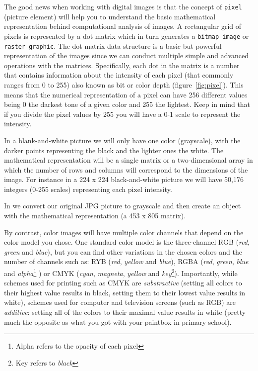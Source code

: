 The good news when working with digital images is that the concept of \texttt{pixel} (picture element) will help you to understand the basic mathematical representation behind computational analysis of images. A rectangular grid of pixels is represented by a dot matrix which in turn generates a \texttt{bitmap image} or \texttt{raster graphic}. The dot matrix data structure is a basic but powerful representation of the images since we can conduct multiple simple and advanced operations with the matrices. Specifically, each dot in the matrix is a number that contains information about the intensity of each pixel (that commonly ranges from 0 to 255) also known as bit or color depth (figure~\ref{fig:pixel}). This means that the numerical representation of a pixel can have 256 different values being 0 the darkest tone of a given color and 255 the lightest. Keep in mind that if you divide the pixel values by 255 you will have a 0-1 scale to represent the intensity.

In a blank-and-white picture we will only have one color (grayscale), with the darker points representing the black and the lighter ones the white. The mathematical representation will be a single matrix or a two-dimensional array in which the number of rows and columns will correspond to the dimensions of the image. For instance in a 224 x 224 black-and-white picture we will have 50,176 integers (0-255 scales) representing each pixel intensity. 

In  we convert our original JPG picture to grayscale and then create an object with the mathematical representation (a 453 x 805 matrix).


By contrast, color images will have multiple color channels that depend on the color model you chose. One standard color model is the  three-channel RGB (\textit{red}, \textit{green} and \textit{blue}), but you can find other variations in the chosen colors and the number of channels such as: RYB (\textit{red}, \textit{yellow} and \textit{blue}), RGBA (\textit{red}, \textit{green}, \textit{blue} and \textit{alpha}\footnote{Alpha refers to the opacity of each pixel} ) or CMYK (\textit{cyan}, \textit{magneta}, \textit{yellow} and \textit{key}\footnote{Key refers to \textit{black}}).  Importantly, while schemes used for printing such as CMYK are \emph{substractive} (setting all colors to their highest value results in black, setting them to their lowest value results in white), schemes used for computer and television screens (such as RGB) are \emph{additive}: setting all of the colors to their maximal value results in white (pretty much the opposite as what you got with your paintbox in primary school).

